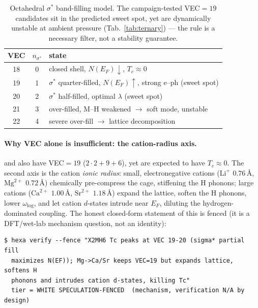 \begin{table}[h]
\centering
\small
\begin{tabular}{ccl}
\toprule
\textbf{VEC} & \textbf{$n_{\sigma^\ast}$} & \textbf{state} \\
\midrule
18 & 0 & closed shell, $N(E_F)\downarrow$, $T_c\approx0$ \\
19 & 1 & $\sigma^\ast$ quarter-filled, $N(E_F)\uparrow$, strong e--ph (sweet spot) \\
20 & 2 & $\sigma^\ast$ half-filled, optimal $\lambda$ (sweet spot) \\
21 & 3 & over-filled, M--H weakened $\to$ soft mode, unstable \\
22 & 4 & severe over-fill $\to$ lattice decomposition \\
\bottomrule
\end{tabular}
\caption{Octahedral $\sigma^\ast$ band-filling model. The campaign-tested
VEC$=19$ candidates sit in the predicted sweet spot, yet are dynamically
unstable at ambient pressure (Tab.~\ref{tab:ternary}) --- the rule is a
necessary filter, not a stability guarantee.}
\label{tab:vec}
\end{table}

\paragraph{Why VEC alone is insufficient: the cation-radius axis.}
 and  also have VEC$=19$ ($2\cdot2+9+6$), yet are
expected to have $T_c\approx0$. The second axis is the cation \emph{ionic
radius}: small, electronegative cations ($\mathrm{Li}^+$ $0.76$\,\AA,
$\mathrm{Mg}^{2+}$ $0.72$\,\AA) chemically pre-compress the  cage,
stiffening the H phonons; large cations ($\mathrm{Ca}^{2+}$ $1.00$\,\AA,
$\mathrm{Sr}^{2+}$ $1.18$\,\AA) expand the lattice, soften the H phonons,
lower $\omega_{\log}$, and let cation $d$-states intrude near $E_F$, diluting
the hydrogen-dominated coupling. The honest closed-form statement of this is fenced (it is a
DFT/wet-lab mechanism question, not an identity):
\begin{lstlisting}[basicstyle=\ttfamily\footnotesize,frame=single,xleftmargin=0pt]
$ hexa verify --fence "X2MH6 Tc peaks at VEC 19-20 (sigma* partial fill
  maximizes N(EF)); Mg->Ca/Sr keeps VEC=19 but expands lattice, softens H
  phonons and intrudes cation d-states, killing Tc"
  tier = WHITE SPECULATION-FENCED  (mechanism, verification N/A by design)
\end{lstlisting}


